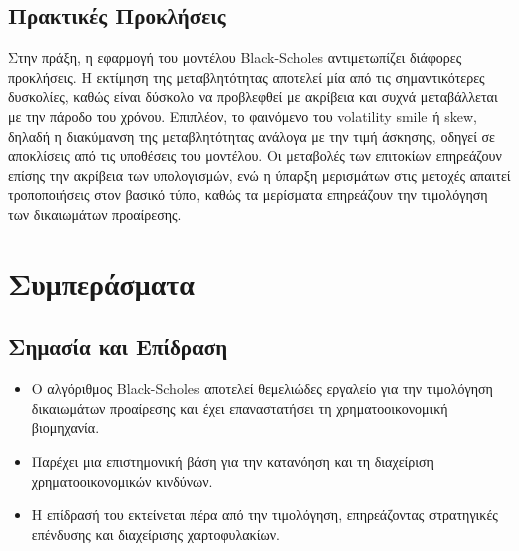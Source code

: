 \subsection{Πρακτικές Προκλήσεις}

Στην πράξη, η εφαρμογή του μοντέλου Black-Scholes αντιμετωπίζει διάφορες προκλήσεις. Η εκτίμηση της μεταβλητότητας αποτελεί μία από τις σημαντικότερες δυσκολίες,
καθώς είναι δύσκολο να προβλεφθεί με ακρίβεια και συχνά μεταβάλλεται με την πάροδο του χρόνου. Επιπλέον, το φαινόμενο του volatility smile ή skew, δηλαδή η
διακύμανση της μεταβλητότητας ανάλογα με την τιμή άσκησης, οδηγεί σε αποκλίσεις από τις υποθέσεις του μοντέλου. Οι μεταβολές των επιτοκίων επηρεάζουν επίσης την
ακρίβεια των υπολογισμών, ενώ η ύπαρξη μερισμάτων στις μετοχές απαιτεί τροποποιήσεις στον βασικό τύπο, καθώς τα μερίσματα επηρεάζουν την τιμολόγηση των δικαιωμάτων προαίρεσης.

\section{Συμπεράσματα}

\subsection{Σημασία και Επίδραση}

\begin{itemize}
  \item Ο αλγόριθμος Black-Scholes αποτελεί θεμελιώδες εργαλείο για την τιμολόγηση δικαιωμάτων προαίρεσης και έχει επαναστατήσει τη χρηματοοικονομική βιομηχανία.
  \item Παρέχει μια επιστημονική βάση για την κατανόηση και τη διαχείριση χρηματοοικονομικών κινδύνων.
  \item Η επίδρασή του εκτείνεται πέρα από την τιμολόγηση, επηρεάζοντας στρατηγικές επένδυσης και διαχείρισης χαρτοφυλακίων.
\end{itemize}